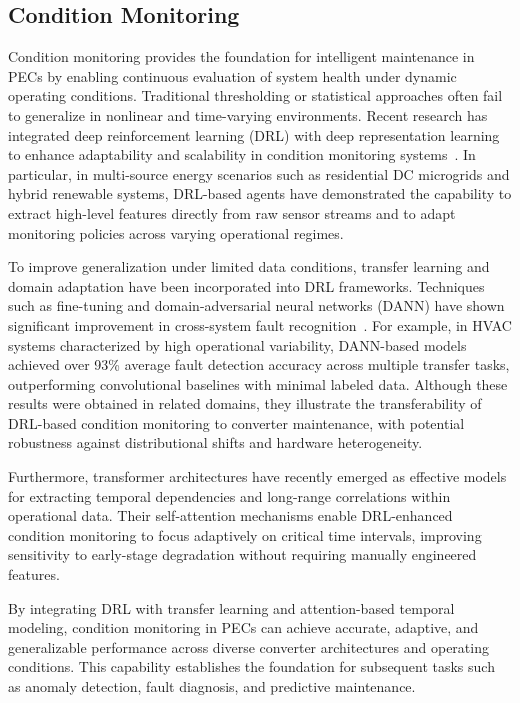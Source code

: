 \subsection{Condition Monitoring}
\label{Condition_Monitoring}

Condition monitoring provides the foundation for intelligent maintenance in PECs by enabling continuous evaluation of system health under dynamic operating conditions. 
Traditional thresholding or statistical approaches often fail to generalize in nonlinear and time-varying environments. 
Recent research has integrated deep reinforcement learning (DRL) with deep representation learning to enhance adaptability and scalability in condition monitoring systems~\cite{xu2024comparative}. 
In particular, in multi-source energy scenarios such as residential DC microgrids and hybrid renewable systems, DRL-based agents have demonstrated the capability to extract high-level features directly from raw sensor streams and to adapt monitoring policies across varying operational regimes.

To improve generalization under limited data conditions, transfer learning and domain adaptation have been incorporated into DRL frameworks. 
Techniques such as fine-tuning and domain-adversarial neural networks (DANN) have shown significant improvement in cross-system fault recognition~\cite{saleem2024transrul}. 
For example, in HVAC systems characterized by high operational variability, DANN-based models achieved over 93\% average fault detection accuracy across multiple transfer tasks, outperforming convolutional baselines with minimal labeled data. 
Although these results were obtained in related domains, they illustrate the transferability of DRL-based condition monitoring to converter maintenance, with potential robustness against distributional shifts and hardware heterogeneity.

Furthermore, transformer architectures have recently emerged as effective models for extracting temporal dependencies and long-range correlations within operational data. 
Their self-attention mechanisms enable DRL-enhanced condition monitoring to focus adaptively on critical time intervals, improving sensitivity to early-stage degradation without requiring manually engineered features. 

By integrating DRL with transfer learning and attention-based temporal modeling, condition monitoring in PECs can achieve accurate, adaptive, and generalizable performance across diverse converter architectures and operating conditions. 
This capability establishes the foundation for subsequent tasks such as anomaly detection, fault diagnosis, and predictive maintenance.


